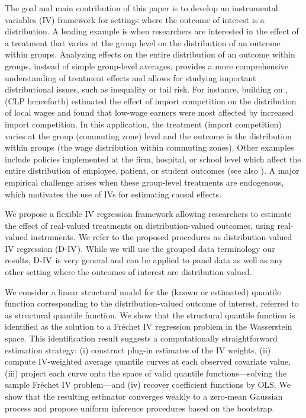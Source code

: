 \documentclass[12pt]{article}
\newcommand{\est}{\ensuremath{\textnormal{D-IV}}\xspace}
\newcommand{\CLP}{CLP\xspace}
\begin{document}
The goal and main contribution of this paper is to develop an instrumental variables (IV) framework for settings where the outcome of interest is a distribution. A leading example is when researchers are interested in the effect of a treatment that varies at the group level on the distribution of an outcome within groups. Analyzing effects on the entire distribution of an outcome within groups, instead of simple group-level averages, provides a more comprehensive understanding of treatment effects and allows for studying important distributional issues, such as inequality or tail risk. For instance, building on \citet{autor2013china}, \citet{chetverikov2016iv} (\CLP henceforth) estimated the effect of import competition on the distribution of local wages and found that low-wage earners were most affected by increased import competition. In this application, the treatment (import competition) varies at the group (commuting zone) level and the outcome is the distribution within groups (the wage distribution within commuting zones).  Other examples include policies implemented at the firm, hospital, or school level which affect the entire distribution of employee, patient, or student outcomes (see also \citet{van2025regression}). A major empirical challenge arises when these group-level treatments are endogenous, which motivates the use of IVs for estimating causal effects. 

We propose a flexible IV regression framework allowing researchers to estimate the effect of real-valued treatments on distribution-valued outcomes, using real-valued instruments. We refer to the proposed procedures as distribution-valued IV regression (\est). While we will use the grouped data terminology our results, \est is very general and can be applied to panel data as well as any other setting where the outcomes of interest are distribution-valued. 

We consider a linear structural model for the (known or estimated) quantile function corresponding to the distribution-valued outcome of interest, referred to as structural quantile function. We show that the structural quantile function is identified as the solution to a Fr\'echet IV regression problem in the Wasserstein space. This identification result suggests a computationally straightforward estimation strategy: (i) construct plug-in estimates of the IV weights, (ii) compute IV-weighted average quantile curves at each observed covariate value, (iii) project each curve onto the space of valid quantile functions---solving the sample Fr\'echet IV problem---and (iv) recover coefficient functions by OLS. We show that the resulting estimator converges weakly to a zero-mean Gaussian process and propose uniform inference procedures based on the bootstrap.
\end{document}
